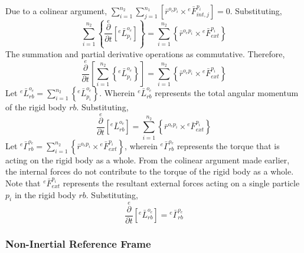 \documentclass[class=report, 12pt, crop=false]{standalone}
\begin{document}
\begin{center}
Due to a colinear argument, $\displaystyle \sum^{n_{2}}_{i = 1}  \sum^{n_{1}}_{j = 1}\left[\bar{r}^{o_{e}p_{i}}\times{}^{e}\bar{F}^{p_{i}}_{int,j}\right] = 0$. Substituting,
$$\sum^{n_{2}}_{i = 1}\left\{ \overset{e}{\frac{\partial}{\partial t}}\left[{}^{e}\bar{L}^{o_{e}}_{p_{i}}\right]\right\} = \sum^{n_{2}}_{i = 1}\left\{ \bar{r}^{o_{e}p_{i}}\times{}^{e}\bar{F}^{p_{i}}_{ext}\right\}$$
The summation and partial derivative operations as commutative. Therefore,
$$\overset{e}{\frac{\partial}{\partial t}}\left[\sum^{n_{2}}_{i = 1}\left\{{}^{e}\bar{L}^{o_{e}}_{p_{i}}\right\}\right] = \sum^{n_{2}}_{i = 1}\left\{ \bar{r}^{o_{e}p_{i}}\times{}^{e}\bar{F}^{p_{i}}_{ext}\right\}$$
Let $\displaystyle {}^{e}\bar{L}^{o_{e}}_{rb} = \sum^{n_{2}}_{i = 1}\left\{{}^{e}\bar{L}^{o_{e}}_{p_{i}}\right\}$. Wherein $\displaystyle {}^{e}\bar{L}^{o_{e}}_{rb}$ represents the total angular momentum of the rigid body $rb$. Substituting,
$$\overset{e}{\frac{\partial}{\partial t}}\left[{}^{e}\bar{L}^{o_{e}}_{rb}\right] = \sum^{n_{2}}_{i = 1}\left\{ \bar{r}^{o_{e}p_{i}}\times{}^{e}\bar{F}^{p_{i}}_{ext}\right\}$$
Let $\displaystyle {}^{e}\bar{\Gamma}^{o_{e}}_{rb} = \sum^{n_{2}}_{i = 1}\left\{ \bar{r}^{o_{e}p_{i}}\times{}^{e}\bar{F}^{p_{i}}_{ext}\right\}\label{euler-law-primitive}$, wherein ${}^{e}\bar{\Gamma}^{o_{e}}_{rb}$ represents the torque that is acting on the rigid body as a whole. From the colinear argument made earlier, the internal forces do not contribute to the torque of the rigid body as a whole. Note that ${}^{e}\bar{F}^{p_{i}}_{ext}$ represents the resultant external forces acting on a single particle $p_{i}$ in the rigid body $rb$. Substituting,
$$\overset{e}{\frac{\partial}{\partial t}}\left[{}^{e}\bar{L}^{o_{e}}_{rb}\right] = {}^{e}\bar{\Gamma}^{o_{e}}_{rb}$$

\subsubsection{Non-Inertial Reference Frame}
\begin{comment}
\end{comment}




\end{center}
\end{document}
